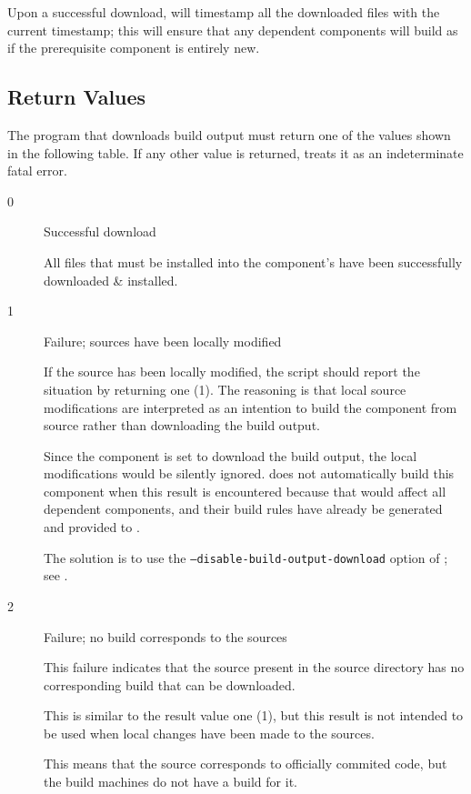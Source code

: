 Upon a successful download, \lmsbw will timestamp all the downloaded
files with the current timestamp; this will ensure that any dependent
components will build as if the prerequisite component is entirely
new.

\subsection{Return Values}
The program that downloads build output must return one of the
values shown in the following table.  If any other value is returned,
\lmsbw treats it as an indeterminate fatal error.


\begin{description}
\item[0]{Successful download}

  All files that must be installed into the component's \destdir have
  been successfully downloaded \& installed.

\item[1]{Failure; sources have been locally modified}

  If the source has been locally modified, the script should report
  the situation by returning one (1).  The reasoning is that local
  source modifications are interpreted as an intention to build the
  component from source rather than downloading the build output.

  Since the component is set to download the build output, the local
  modifications would be silently ignored.  \lmsbw does not
  automatically build this component when this result is encountered
  because that would affect all dependent components, and their build
  rules have already be generated and provided to \make.

  The solution is to use the \texttt{--disable-build-output-download}
  option of \lmsbwcmd; see .

\item[2]{Failure; no build corresponds to the sources}

  This failure indicates that the source present in the source
  directory has no corresponding build that can be downloaded.

  This is similar to the result value one (1), but this result is not
  intended to be used when local changes have been made to the
  sources.

  This means that the source corresponds to officially commited code,
  but the build machines do not have a build for it.


\end{description}
